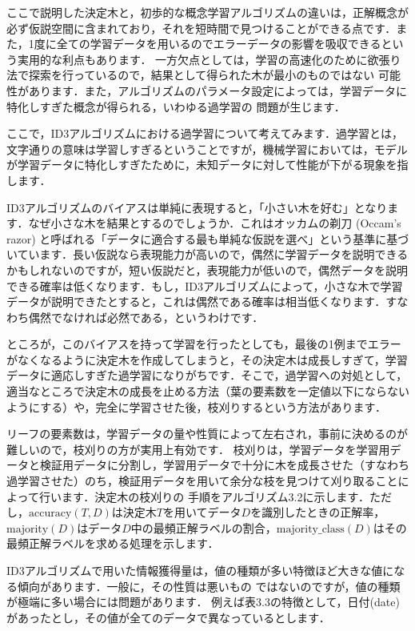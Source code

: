 ここで説明した決定木と，初歩的な概念学習アルゴリズムの違いは，正解概念が必ず仮説空間に含まれており，それを短時間で見つけることができる点です．また，1度に全ての学習データを用いるのでエラーデータの影響を吸収できるという実用的な利点もあります．
一方欠点としては，学習の高速化のために欲張り法で探索を行っているので，結果として得られた木が最小のものではない
可能性があります．また，アルゴリズムのパラメータ設定によっては，学習データに特化しすぎた概念が得られる，いわゆる過学習の
問題が生じます．


ここで，ID3アルゴリズムにおける過学習について考えてみます．過学習とは，文字通りの意味は学習しすぎるということですが，機械学習においては，モデルが学習データに特化しすぎたために，未知データに対して性能が下がる現象を指します．

ID3アルゴリズムのバイアスは単純に表現すると，「小さい木を好む」となります．なぜ小さな木を結果とするのでしょうか．これはオッカムの剃刀 (Occam's razor) と呼ばれる「データに適合する最も単純な仮説を選べ」という基準に基づいています．長い仮説なら表現能力が高いので，偶然に学習データを説明できるかもしれないのですが，短い仮説だと，表現能力が低いので，偶然データを説明できる確率は低くなります．もし，ID3アルゴリズムによって，小さな木で学習データが説明できたとすると，これは偶然である確率は相当低くなります．すなわち偶然でなければ必然である，というわけです．

ところが，このバイアスを持って学習を行ったとしても，最後の1例までエラーがなくなるように決定木を作成してしまうと，その決定木は成長しすぎて，学習データに適応しすぎた過学習になりがちです．そこで，過学習への対処として，
適当なところで決定木の成長を止める方法（葉の要素数を一定値以下にならないようにする）や，完全に学習させた後，枝刈りするという方法があります．


リーフの要素数は，学習データの量や性質によって左右され，事前に決めるのが難しいので，枝刈りの方が実用上有効です．
枝刈りは，学習データを学習用データと検証用データに分割し，学習用データで十分に木を成長させた（すなわち
過学習させた）のち，検証用データを用いて余分な枝を見つけて刈り取ることによって行います．決定木の枝刈りの
手順をアルゴリズム3.2に示します．ただし，$\mbox{accuracy}(T, D)$は決定木$T$を用いてデータ$D$を識別したときの正解率，
$\mbox{majority}(D)$はデータ$D$中の最頻正解ラベルの割合，$\mbox{majority\_class}(D)$はその最頻正解ラベルを求める処理を示します．


ID3アルゴリズムで用いた情報獲得量は，値の種類が多い特徴ほど大きな値になる傾向があります．一般に，その性質は悪いもの
ではないのですが，値の種類が極端に多い場合には問題があります．
例えば表3.3の特徴として，日付(date)があったとし，その値が全てのデータで異なっているとします．

